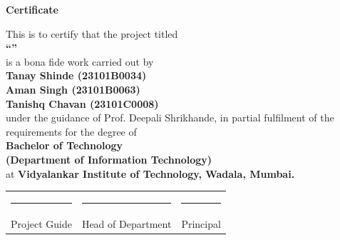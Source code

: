 \cleardoublepage
\thispagestyle{empty}
\begin{center}
{\Huge\textbf{Certificate}}
\end{center}
\vspace{0.05in}
\begin{center}
\large This is to certify that the project titled\\[0.15in]
\textbf{``\projtitle''}\\[0.1in]
is a bona fide work carried out by\\[0.15in]
\textbf{Tanay Shinde (23101B0034)\\[0.12in]
Aman Singh (23101B0063)\\[0.12in]
Tanishq Chavan (23101C0008)}\\[0.1in]
under the guidance of Prof. Deepali Shrikhande, in partial fulfilment of the requirements for the degree of\\[0.12in]
\textbf{Bachelor of Technology}\\[0.08in]
\textbf{(Department of Information Technology)}\\
at \textbf{Vidyalankar Institute of Technology, Wadala, Mumbai.}
\end{center}
\vspace{0.8in}
\begin{center}
\begin{tabularx}{0.88\textwidth}{@{}>{\centering\arraybackslash}X >{\centering\arraybackslash}X >{\centering\arraybackslash}X@{}}
\rule{3.2cm}{0.4pt} & \rule{3.2cm}{0.4pt} & \rule{3.2cm}{0.4pt} \\[0.12in]
Project Guide & Head of Department & Principal
\end{tabularx}
\end{center}

